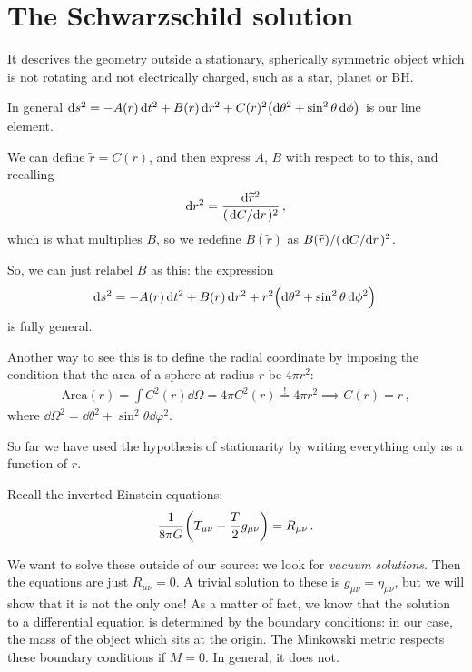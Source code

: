 \documentclass[main.tex]{subfiles}
\begin{document}
\section{The Schwarzschild solution}

It descrives the geometry outside a stationary, spherically symmetric object which is not rotating and not electrically charged, such as a star, planet or BH.

In general \(\dd{s^2} = -A(r) \dd{t^2} + B(r) \dd{r^2} + C(r)^2 \qty(\dd{\theta^2} + \sin^2 \theta \dd{\phi })\) is our line element.

We can define \(\widetilde{r} = C(r)\), and then express \(A\), \(B\) with respect to to this, and recalling 
%
\begin{align}
    \dd{r^2} = 
  \frac{\dd{\widetilde{r}^2} }{(\dv*{C}{r})^2}
\,,
\end{align}
%
which is what multiplies \(B\), so we redefine \(B(\widetilde{r}) \) as \(B(\widetilde{r}) / (\dv*{C}{r})^2\).

So, we can just relabel \(B\) as this: the expression 
%
\begin{align}
    \dd{s^2} = -A(r) \dd{t^2} + B(r) \dd{r^2} + r^2\qty(\dd{\theta^2} + \sin^2 \theta \dd{\phi }^2)
\,
\end{align}
%
is fully general.

\begin{bluebox}
Another way to see this is to define the radial coordinate by imposing the condition that the area of a sphere at radius \(r\) be \(4 \pi r^2\): 
%
\begin{align}
\text{Area} (r) = \int C^2(r) \dd{\Omega} = 4 \pi C^2(r)
\overset{!}{=} 4 \pi r^2 \implies C (r) =r 
\,,
\end{align}
%
where \(\dd{\Omega^2} = \dd{\theta^2} + \sin^2\theta \dd{\varphi^2}\).
\end{bluebox}

So far we have used the hypothesis of stationarity by writing everything only as a function of \(r\).

Recall the inverted Einstein equations: 
%
\begin{align}
  \frac{1}{8 \pi G} \qty(T_{\mu \nu } - \frac{T}{2} g_{\mu \nu }) = R_{\mu \nu }
\,.
\end{align}
%

We want to solve these outside of our source: we look for \emph{vacuum solutions}. Then the equations are just \(R_{\mu \nu } =0\).
A trivial solution to these is \(g_{\mu \nu } = \eta_{\mu \nu }\), but we will show that it is not the only one!
As a matter of fact, we know that the solution to a differential equation is determined by the boundary conditions: in our case, the mass of the object which sits at the origin.
The Minkowski metric respects these boundary conditions if \(M=0\). In general, it does not.
\end{document}
